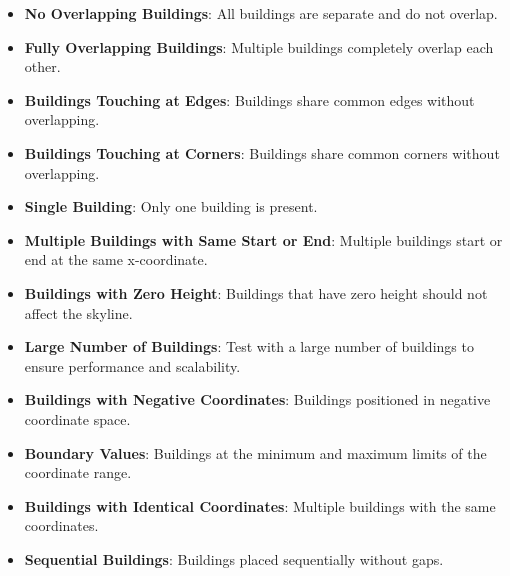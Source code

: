\begin{itemize}
    \item \textbf{No Overlapping Buildings}: All buildings are separate and do not overlap.
    
    \item \textbf{Fully Overlapping Buildings}: Multiple buildings completely overlap each other.
    
    \item \textbf{Buildings Touching at Edges}: Buildings share common edges without overlapping.
    
    \item \textbf{Buildings Touching at Corners}: Buildings share common corners without overlapping.
    
    \item \textbf{Single Building}: Only one building is present.
    
    \item \textbf{Multiple Buildings with Same Start or End}: Multiple buildings start or end at the same x-coordinate.
    
    \item \textbf{Buildings with Zero Height}: Buildings that have zero height should not affect the skyline.
    
    \item \textbf{Large Number of Buildings}: Test with a large number of buildings to ensure performance and scalability.
    
    \item \textbf{Buildings with Negative Coordinates}: Buildings positioned in negative coordinate space.
    
    \item \textbf{Boundary Values}: Buildings at the minimum and maximum limits of the coordinate range.
    
    \item \textbf{Buildings with Identical Coordinates}: Multiple buildings with the same coordinates.
    
    \item \textbf{Sequential Buildings}: Buildings placed sequentially without gaps.
    

\end{itemize}

